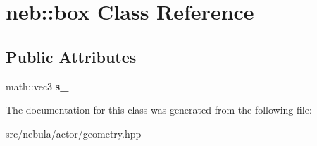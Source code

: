 \hypertarget{classneb_1_1box}{
\section{neb::box Class Reference}
\label{classneb_1_1box}
}
\subsection*{Public Attributes}
\begin{DoxyCompactItemize}
\item 
\hypertarget{classneb_1_1box_a7c1a37ac522ae516df9e6058a756c7d3}{
math::vec3 {\bfseries s\_\-}}
\label{classneb_1_1box_a7c1a37ac522ae516df9e6058a756c7d3}

\end{DoxyCompactItemize}


The documentation for this class was generated from the following file:\begin{DoxyCompactItemize}
\item 
src/nebula/actor/geometry.hpp\end{DoxyCompactItemize}
